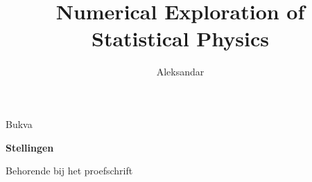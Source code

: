 \documentclass[pdftex,a5paper]{dissertation}
\begin{document}
\title{Numerical Exploration of Statistical Physics \\}
\author{Aleksandar}{Bukva}

\begin{center}

{\Large\titlefont\bfseries Stellingen\\}

\vspace{2mm}
Behorende bij het proefschrift

\medskip



\bigskip

{\makeatletter
\titlestyle\bfseries\large\@title
\makeatother}

{\makeatletter
\ifx\@subtitle\undefined\else
    \titlefont\titleshape\@subtitle
\fi
\makeatother}

%
%


\end{center}

\smallskip
\end{document}
